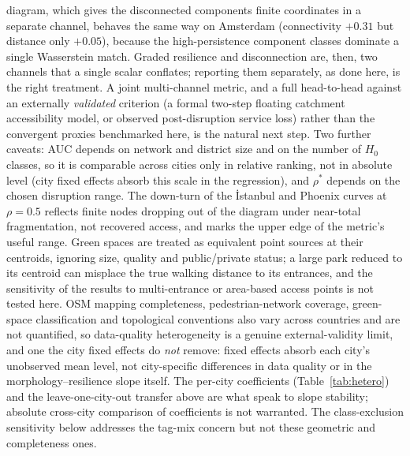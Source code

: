 \documentclass[sn-mathphys-num,pdflatex]{sn-jnl}
\newcommand{\rhostar}{\rho^{*}}
\begin{document}
diagram, which gives the disconnected components finite coordinates in a separate
channel, behaves the same way on Amsterdam (connectivity $+0.31$ but distance only
$+0.05$), because the high-persistence component classes dominate a single
Wasserstein match. Graded resilience and disconnection are, then, two channels that
a single scalar conflates; reporting them separately, as done here, is the right
treatment. A joint multi-channel metric, and a full head-to-head against an
externally \emph{validated} criterion (a formal two-step floating catchment
accessibility model, or observed post-disruption service loss) rather than the
convergent proxies benchmarked here, is the natural next step. Two further
caveats:
AUC depends on network and district size and on the number of $H_0$ classes, so it
is comparable across cities only in relative ranking, not in absolute level (city
fixed effects absorb this scale in the regression), and $\rhostar$ depends on the
chosen disruption range. The down-turn of the İstanbul and Phoenix curves at
$\rho=0.5$ reflects finite nodes dropping out of the diagram under near-total
fragmentation, not recovered access, and marks the upper edge of the metric's
useful range. Green spaces are treated as equivalent point sources at their
centroids, ignoring size, quality and public/private status; a large park reduced to
its centroid can misplace the true walking distance to its entrances, and the
sensitivity of the results to multi-entrance or area-based access points is not
tested here. OSM mapping completeness, pedestrian-network coverage, green-space classification and
topological conventions also vary across countries and are not quantified, so
data-quality heterogeneity is a genuine external-validity limit, and one the city fixed
effects do \emph{not} remove: fixed effects absorb each city's unobserved mean level,
not city-specific differences in data quality or in the morphology--resilience slope
itself. The per-city coefficients (Table~\ref{tab:hetero}) and the leave-one-city-out
transfer above are what speak to slope stability; absolute cross-city comparison of
coefficients is not warranted.
The class-exclusion sensitivity below addresses the tag-mix concern but not these
geometric and completeness ones.
\end{document}
